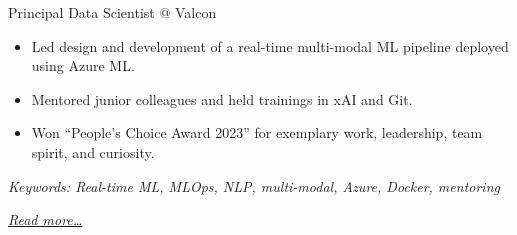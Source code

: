 \large{Principal Data Scientist @ Valcon}

\normalsize
\begin{itemize}  
    \item Led design and development of a real-time multi-modal ML pipeline deployed using Azure ML.
    \item Mentored junior colleagues and held trainings in xAI and Git.
    \item Won “People's Choice Award 2023” for exemplary work, leadership, team
    spirit, and curiosity.
\end{itemize}

{\footnotesize\textit{Keywords: Real-time ML, MLOps, NLP, multi-modal, Azure, Docker, mentoring}}

\hfill{\small{\textit{\hyperref[sec:valcon]{Read more…}}}}

